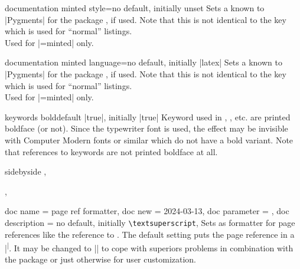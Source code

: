 \begin{docTcbKey}{documentation minted style}{=}{no default, initially unset}
  Sets a  known to |Pygments| \cite{pygments:web} for
  the package  \cite{poore:minted}, if used.
  Note that this is not identical to the key
   which is used for \enquote{normal} listings.\\
  Used for |=minted| only.
\end{docTcbKey}

\begin{docTcbKey}[][doc new=2017-04-24]{documentation minted language}{=}{no default, initially |latex|}
  Sets a  known to |Pygments| \cite{pygments:web}
  for the package  \cite{poore:minted}, if used.
  Note that this is not identical to the key
   which is used for \enquote{normal} listings.\\
  Used for |=minted| only.
\end{docTcbKey}

\clearpage

\begin{docTcbKey}[][doc new=2017-04-25]{keywords bold}{}{default |true|, initially |true|}
  Keyword used in , , etc. are printed
  boldface (or not). Since the typewriter font is used, the effect may be
  invisible with Computer Modern fonts or similar which do not
  have a bold variant. Note that references to keywords are not printed boldface at all.
\begin{dispExample*}{sidebyside}
\LARGE
{}, 

, 
\end{dispExample*}
\end{docTcbKey}


\begin{docTcbKeys}
  {
    {
      doc name        = page ref formatter,
      doc new         = {2024-03-13},
      doc parameter   = ,
      doc description = {no default, initially \texttt{\textbackslash textsuperscript}},
    }
  }
Sets  as formatter for page references like the
reference to .
The default setting puts the page reference in a |\textsuperscript|.
It may be changed to |\fakesuperscript| to cope with superiors problems
in combination with the  package or just otherwise for user customization.
\end{docTcbKeys}



